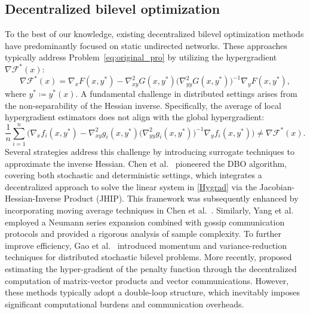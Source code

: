 \documentclass{article}
\theoremstyle{plain}
\theoremstyle{definition}
\theoremstyle{remark}
\begin{document}
\subsection{Decentralized bilevel optimization}\label{app:decentralized_bilevel}
To the best of our knowledge, existing decentralized bilevel optimization methods have predominantly focused on static undirected networks. 
These approaches typically address Problem~\eqref{eq:original_pro} by utilizing the hypergradient $\nabla \mathcal{F}^*(x)$:
\begin{equation}\label{Hygrad}
    \nabla \mathcal{F}^*(x) = \nabla_x F(x, y^*) - \nabla_{xy}^2 G(x, y^*) \big(\nabla_{yy}^2 G(x, y^*)\big)^{-1} \nabla_y F(x, y^*),
\end{equation}
where $y^* \coloneqq y^{*}(x)$. 
A fundamental challenge in distributed settings arises from the non-separability of the Hessian inverse. Specifically, the average of local hypergradient estimators does not align with the global hypergradient:
\begin{equation*}
    \frac{1}{n}\sum_{i=1}^{n} \Big( \nabla_x f_{i}(x, y^*) - \nabla_{xy}^2 g_{i}(x, y^*) \big(\nabla_{yy}^2 g_{i}(x, y^*)\big)^{-1} \nabla_y f_{i}(x, y^*) \Big) \ne \nabla \mathcal{F}^*(x).
\end{equation*}
Several strategies address this challenge by introducing surrogate techniques to approximate the inverse Hessian. 
Chen et al.~ pioneered the DBO algorithm, covering both stochastic and deterministic settings, which integrates a decentralized approach to solve the linear system in \eqref{Hygrad} via the Jacobian-Hessian-Inverse Product (JHIP). This framework was subsequently enhanced by incorporating moving average techniques in Chen et al.~. 
Similarly, Yang et al.~ employed a Neumann series expansion combined with gossip communication protocols and provided a rigorous analysis of sample complexity. 
To further improve efficiency, Gao et al.~ introduced momentum and variance-reduction techniques for distributed stochastic bilevel problems. 
More recently, \citet{nazari2025penalty} proposed estimating the hyper-gradient of the penalty function through the decentralized computation of matrix-vector products and vector communications.
However, these methods typically adopt a double-loop structure, which inevitably imposes significant computational burdens and communication overheads.
\end{document}
